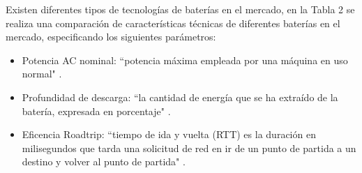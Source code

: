 \begin{table}[htbp]
\end{table}%







Existen diferentes tipos de tecnologías de baterías en el mercado, en la Tabla 2 se realiza una comparación de características técnicas de diferentes baterías en el mercado, especificando los siguientes parámetros:
\begin{itemize}
    \item Potencia AC nominal: ``potencia máxima empleada por una máquina en uso normal" \cite{proyecto_mg}.
    \item Profundidad de descarga: ``la cantidad de energía que se ha extraído de la batería, expresada en porcentaje" \cite{profundidad_descarga}.
    \item Eficencia Roadtrip: ``tiempo de ida y vuelta (RTT) es la duración en milisegundos que tarda una solicitud de red en ir de un punto de partida a un destino y volver al punto de partida" \cite{tiempo_ida_vuelta}.
\end{itemize}
